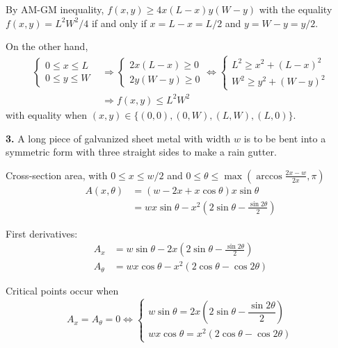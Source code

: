 \documentclass[a4paper,12pt]{article}
\newcommand{\exercise}[1]{\noindent\textbf{#1.}}
\begin{document}
By AM-GM inequality, $f(x, y) \geq 4x(L-x)y(W-y)$ with the equality
$f(x, y) = L^2W^2/4$ if and only if $x = L - x = L/2$ and $y = W - y = y/2$.

On the other hand,
\begin{align*}
  \begin{cases}
    0 \leq x \leq L\\
    0 \leq y \leq W
  \end{cases}
  &\Longrightarrow
  \begin{cases}
    2x(L - x) \geq 0\\
    2y(W - y) \geq 0
  \end{cases}
  \iff
  \begin{cases}
    L^2 \geq x^2 + (L-x)^2\\
    W^2 \geq y^2 + (W-y)^2
  \end{cases}\\
  &\Longrightarrow
  f(x, y) \leq L^2W^2
\end{align*}
with equality when $(x, y) \in \{(0, 0), (0, W), (L, W), (L, 0)\}$.

\exercise{3} A long piece of galvanized sheet metal with width $w$ is to be
bent into a symmetric form with three straight sides to make a rain gutter.

Cross-section area, with $0 \leq x \leq w/2$
and $0 \leq \theta \leq \max\left(\arccos\frac{2x-w}{2x}, \pi\right)$
\begin{align*}
  A(x, \theta) &= (w - 2x + x\cos\theta)x\sin\theta\\
  &= wx\sin\theta - x^2\left(2\sin\theta - \frac{\sin2\theta}{2}\right)
\end{align*}

First derivatives:
\begin{align*}
  A_x &= w\sin\theta - 2x\left(2\sin\theta - \frac{\sin2\theta}{2}\right)\\
  A_\theta &= wx\cos\theta - x^2(2\cos\theta - \cos2\theta)
\end{align*}

Critical points occur when
\[A_x = A_\theta = 0 \iff
\begin{cases}
  w\sin\theta = 2x\left(2\sin\theta - \dfrac{\sin2\theta}{2}\right)\\
  wx\cos\theta = x^2(2\cos\theta - \cos2\theta)
\end{cases}\tag{$*$}\]

\end{document}
